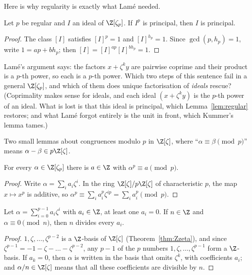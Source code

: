 Here is why regularity is exactly what Lamé needed.

\begin{lemma}\label{lem:regular}
Let $p$ be regular and $I$ an ideal of $\Z[\zeta_p]$. If $I^p$ is principal, then $I$ is principal.
\end{lemma}
\begin{proof}
The class $[I]$ satisfies $[I]^p=1$ and $[I]^{h_p}=1$. Since $\gcd(p,h_p)=1$, write $1=ap+bh_p$; then
$[I]=[I]^{ap}[I]^{bh_p}=1$.
\end{proof}

\begin{think}
Lamé's argument says: the factors $x+\zeta^ky$ are pairwise coprime and their product is a $p$-th power, so each is a $p$-th
power. Which two steps of this sentence fail in a general $\Z[\zeta_p]$, and which of them does unique factorisation of
\emph{ideals} rescue? (Coprimality makes sense for ideals, and each ideal $(x+\zeta^ky)$ is the $p$-th power of an ideal.
What is lost is that this ideal is principal, which Lemma~\ref{lem:regular} restores; and what Lamé forgot entirely is the
unit in front, which Kummer's lemma tames.)
\end{think}

Two small lemmas about congruences modulo $p$ in $\Z[\zeta]$, where ``$\alpha\equiv\beta\pmod p$'' means $\alpha-\beta\in p\Z
[\zeta]$.

\begin{lemma}\label{lem:pthpower}
For every $\alpha\in\Z[\zeta_p]$ there is $a\in\Z$ with $\alpha^p\equiv a\pmod p$.
\end{lemma}
\begin{proof}
Write $\alpha=\sum_ia_i\zeta^i$. In the ring $\Z[\zeta]/p\Z[\zeta]$ of characteristic $p$, the map $x\mapsto x^p$ is additive, so
$\alpha^p\equiv\sum_ia_i^p\zeta^{ip}=\sum_ia_i^p\pmod p$.
\end{proof}

\begin{lemma}\label{lem:zerocoef}
Let $\alpha=\sum_{i=0}^{p-1}a_i\zeta^i$ with $a_i\in\Z$, at least one $a_i=0$. If $n\in\Z$ and $\alpha\equiv0\pmod n$, then
$n$ divides every $a_i$.
\end{lemma}
\begin{proof}
$1,\zeta,\dots,\zeta^{p-2}$ is a $\Z$-basis of $\Z[\zeta]$ (Theorem~\ref{thm:Zzeta}), and since $\zeta^{p-1}=-1-\zeta-\dots-
\zeta^{p-2}$, any $p-1$ of the $p$ numbers $1,\zeta,\dots,\zeta^{p-1}$ form a $\Z$-basis. If $a_k=0$, then $\alpha$ is written
in the basis that omits $\zeta^k$, with coefficients $a_i$; and $\alpha/n\in\Z[\zeta]$ means that all these coefficients are
divisible by $n$.
\end{proof}

